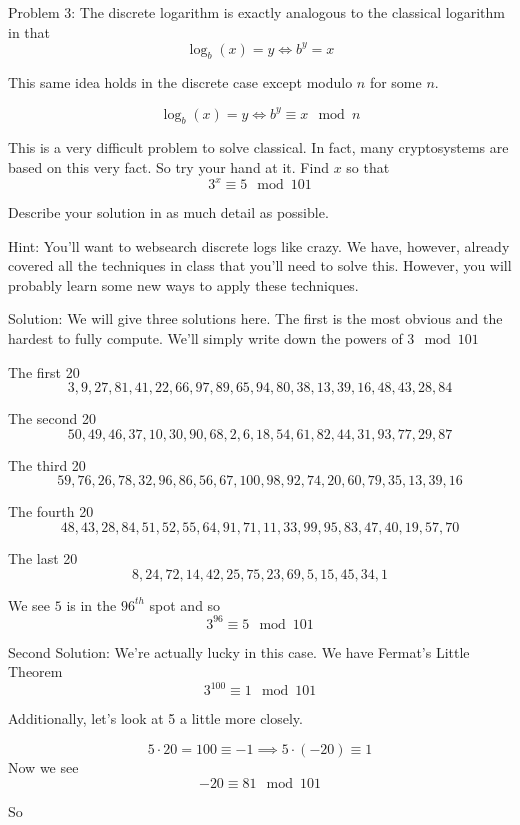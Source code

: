 \documentclass[16 pt]{amsart}
\theoremstyle{definition}
\theoremstyle{remark}
\numberwithin{equation}{subsection}
\begin{document}
\newpage


Problem 3: The discrete logarithm is exactly analogous to the classical logarithm in that 
\[
\log_b(x) = y  \iff b^y =x
\]

This same idea holds in the discrete case except modulo $n$ for some $n$.

\[
\log_b(x) = y  \iff b^y \equiv x \mod{n} 
\]

This is a very difficult problem to solve classical.  In fact, many cryptosystems are based on this very fact.  So try your hand at it.  Find $x$ so that
\[
3^x \equiv 5 \mod{101}
\]

Describe your solution in as much detail as possible.

\vspace{.25in}

Hint: You'll want to websearch discrete logs like crazy.  We have, however, already covered all the techniques in class that you'll need to solve this.  However, you will probably learn some new ways to apply these techniques.


\vspace{.5in}

Solution: We will give three solutions here.  The first is the most obvious and the hardest to fully compute.  We'll simply write down the powers of $3 \mod{101}$

The first 20
\[
3,9,27,81,41,22,66,97,89,65,94,80,38,13,39,16,48,43,28,84
\]

The second 20
\[
50,49,46,37,10,30,90,68,2,6,18,54,61,82,44,31,93,77,29,87
\]

The third 20
\[
59,76,26,78,32,96,86,56,67,100,98,92,74,20,60,79,35,13,39,16
\]

The fourth 20
\[
48,43,28,84,51,52,55,64,91,71,11,33,99,95,83,47,40,19,57,70
\]

The last 20
\[
8,24,72,14,42,25,75,23,69,5,15,45,34,1
\]

We see $5$ is in the $96^{th}$ spot and so
\[
3^{96} \equiv 5 \mod{101}
\]


\vspace{.25in}

Second Solution:  We're actually lucky in this case.  We have Fermat's Little Theorem 
\[
3^{100} \equiv 1 \mod{101}
\]

Additionally, let's look at 5 a little more closely.

\[
5\cdot 20 = 100 \equiv -1  \implies 5\cdot(-20) \equiv 1
\]
Now we see
\[
-20 \equiv 81 \mod{101}
\]

So 
\end{document}
